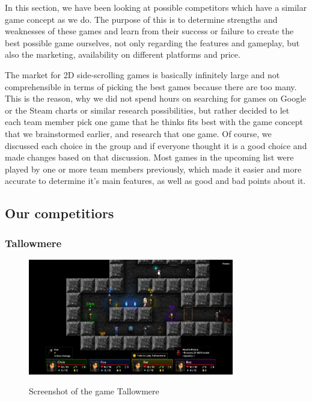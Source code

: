 \documentclass[12p]{article}
\begin{document}

In this section, we have been looking at possible competitors which have a similar game concept as we do. The purpose of this is to determine strengths and weaknesses of these games and learn from their success or failure to create the best possible game ourselves, not only regarding the features and gameplay, but also the marketing, availability on different platforms and price.

The market for 2D side-scrolling games is basically infinitely large and not comprehensible in terms of picking the best games because there are too many. This is the reason, why we did not spend hours on searching for games on Google or the Steam charts or similar research possibilities, but rather decided to let each team member pick one game that he thinks fits best with the game concept that we brainstormed earlier, and research that one game. Of course, we discussed each choice in the group and if everyone thought it is a good choice and made changes based on that discussion. Most games in the upcoming list were played by one or more team members previously, which made it easier and more accurate to determine it's main features, as well as good and bad points about it.


\newpage
\subsection{Our competitiors}

\subsubsection[Tallowmere]{Tallowmere \cite{Tallowmere}} \label{sec:StateOfTheArt_Tallowmere}

\begin{figure}[ht]
  \center
  \includegraphics[width=0.8\textwidth]{StateOfTheArtScreenshots/tallowmere.jpeg}
  \label{sec:StateOfTheArt_Screenshots_Tallowmere}
  \caption{Screenshot of the game Tallowmere \cite{Tallowmere}}
\end{figure}
\end{document}
